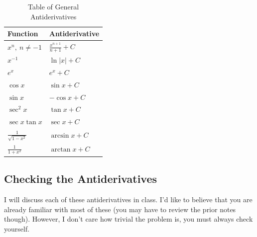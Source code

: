 \documentclass[12pt,addpoints, answers, fleqn]{exam}
\begin{document}
\begin{table}[htdp]
\caption{Table of General Antiderivatives}
\begin{center}
\begin{tabular}{|l|l|}
\hline
Function & Antiderivative\\
\hline
$x^n, \ n\neq -1$ & $\displaystyle \frac{x^{n+1}}{n+1} + C$\\[7pt]
$x^{-1}$ & $\ln \left| x \right| + C$\\[7pt]
$e^x$ & $e^x + C$\\[7pt]
$\cos x$ & $\sin x + C$\\[7pt]
$\sin x$ & $-\cos x + C$\\[7pt]
$\sec^2 x$ & $\tan x + C$\\[7pt]
$\sec x \tan x$ & $\sec x + C$\\[7pt]
$\displaystyle \frac{1}{\sqrt{1-x^2}}$ & $\arcsin x + C$\\[7pt]
$\displaystyle \frac{1}{1+x^2}$ & $\arctan x + C$\\[7pt]
\hline
\end{tabular}
\end{center}
\end{table}%

\subsection{Checking the Antiderivatives}

I will discuss each of these antiderivatives in class. I'd like to believe that you are already familiar with most of these (you may have to review the prior notes though). However, I don't care how trivial the problem is, you must always check yourself.
\end{document}
